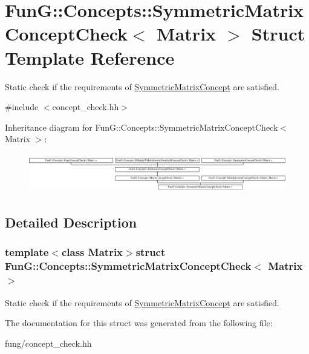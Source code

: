 \hypertarget{structFunG_1_1Concepts_1_1SymmetricMatrixConceptCheck}{\section{Fun\-G\-:\-:Concepts\-:\-:Symmetric\-Matrix\-Concept\-Check$<$ Matrix $>$ Struct Template Reference}
\label{structFunG_1_1Concepts_1_1SymmetricMatrixConceptCheck}
}


Static check if the requirements of \hyperlink{structFunG_1_1Concepts_1_1SymmetricMatrixConcept}{Symmetric\-Matrix\-Concept} are satisfied.  




{\ttfamily \#include $<$concept\-\_\-check.\-hh$>$}

Inheritance diagram for Fun\-G\-:\-:Concepts\-:\-:Symmetric\-Matrix\-Concept\-Check$<$ Matrix $>$\-:\begin{figure}[H]
\begin{center}
\leavevmode
\includegraphics[height=1.728395cm]{structFunG_1_1Concepts_1_1SymmetricMatrixConceptCheck}
\end{center}
\end{figure}


\subsection{Detailed Description}
\subsubsection*{template$<$class Matrix$>$struct Fun\-G\-::\-Concepts\-::\-Symmetric\-Matrix\-Concept\-Check$<$ Matrix $>$}

Static check if the requirements of \hyperlink{structFunG_1_1Concepts_1_1SymmetricMatrixConcept}{Symmetric\-Matrix\-Concept} are satisfied. 

The documentation for this struct was generated from the following file\-:\begin{DoxyCompactItemize}
\item 
fung/concept\-\_\-check.\-hh\end{DoxyCompactItemize}
